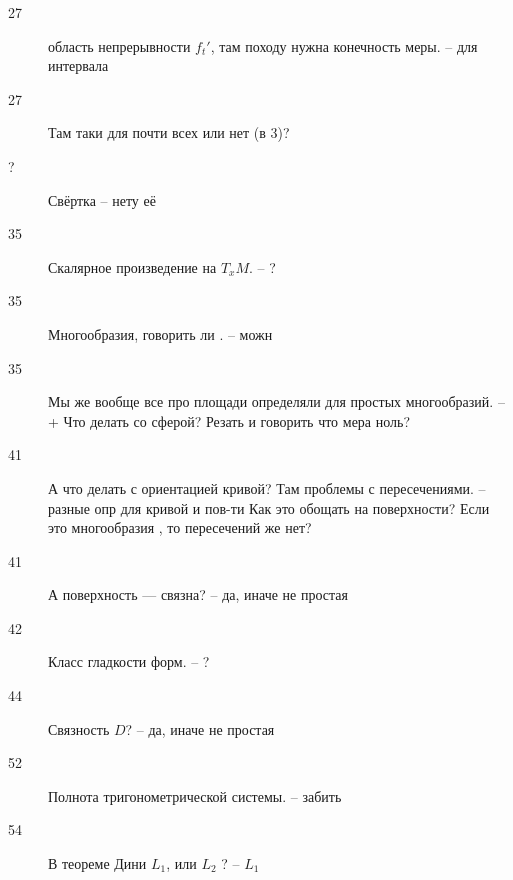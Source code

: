 \documentclass[timbord]{longnotes}
\begin{document}
\begin{description}
  \item[27] область непрерывности $f_t'$, там походу нужна конечность меры.                            -- для интервала
  \item[27] Там таки для почти всех или нет (в 3)? 
  \item[?] Свёртка                                                                                     -- нету её
  \item[35] Скалярное произведение на $T_xM$.                                                          -- ?
  \item[35] Многообразия, говорить ли .                                                                -- можн
  \item[35] Мы же вообще все про площади определяли для простых многообразий.                          -- +
    Что делать со сферой? Резать и говорить что мера ноль?
  \item[41] А что делать с ориентацией кривой? Там проблемы с пересечениями.                           -- разные опр для кривой и пов-ти
    Как это обощать на поверхности? Если это многообразия , то пересечений же нет?
  \item[41] А поверхность --- связна?                                                                  -- да, иначе не простая
  \item[42] Класс гладкости форм.                                                                      -- ?
  \item[44] Связность $D$?                                                                             -- да, иначе не простая 
  \item[52] Полнота тригонометрической системы.                                                        -- забить
  \item[54] В теореме Дини $L_1$, или $L_2$ ?                                                          -- $L_1$
\end{description}
\end{document}

